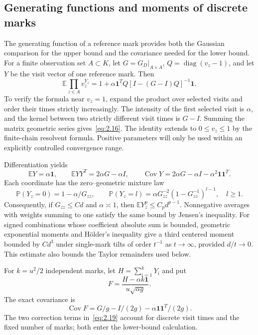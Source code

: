 \documentclass[11pt,a4paper]{article}
\numberwithin{equation}{section}
\theoremstyle{remark}
\begin{document}
\subsection{Generating functions and moments of discrete marks}\label{sec:markformulas}
The generating function of a reference mark provides both the Gaussian comparison for the upper bound and the covariance needed for the lower bound. For a finite observation set $A\subset K$, let $G=G_D|_{A\times A}$, $Q=\operatorname{diag}(v_z-1)$, and let $Y$ be the visit vector of one reference mark. Then
\begin{equation}\label{eq:2.16}
\mathbb E\prod_{z\in A}v_z^{Y_z}
=1+\alpha\mathbf1^TQ[I-(G-I)Q]^{-1}\mathbf1.
\end{equation}
To verify the formula near $v_z=1$, expand the product over selected visits and order their times strictly increasingly. The intensity of the first selected visit is $\alpha$, and the kernel between two strictly different visit times is $G-I$. Summing the matrix geometric series gives~\eqref{eq:2.16}. The identity extends to $0\le v_z\le1$ by the finite-chain resolvent formula. Positive parameters will only be used within an explicitly controlled convergence range.

Differentiation yields
\begin{equation}\label{eq:2.17}
\mathbb EY=\alpha\mathbf1,\qquad
\mathbb EYY^T=2\alpha G-\alpha I,\qquad
\operatorname{Cov}Y=2\alpha G-\alpha I-\alpha^2\mathbf1\mathbf1^T.
\end{equation}
Each coordinate has the zero--geometric mixture law
\begin{equation}\label{eq:2.18}
\mathbb P(Y_z=0)=1-\alpha/G_{zz},\qquad
\mathbb P(Y_z=l)=\alpha G_{zz}^{-2}(1-G_{zz}^{-1})^{l-1},\quad l\ge1.
\end{equation}
Consequently, if $G_{zz}\le Cd$ and $\alpha\asymp1$, then $\mathbb E Y_z^p\le C_pd^{p-1}$. Nonnegative averages with weights summing to one satisfy the same bound by Jensen's inequality. For signed combinations whose coefficient absolute sum is bounded, geometric exponential moments and H\"older's inequality give a third centered moment bounded by $Cd^3$ under single-mark tilts of order $t^{-1}$ as $t\to\infty$, provided $d/t\to0$. This estimate also bounds the Taylor remainders used below.

For $k=u^2/2$ independent marks, let $H=\sum_{i=1}^kY_i$ and put
\[
F=\frac{H-\alpha k\mathbf1}{u\sqrt{\alpha g}}.
\]
The exact covariance is
\begin{equation}\label{eq:2.19}
\operatorname{Cov}F=G/g-I/(2g)-\alpha\mathbf1\mathbf1^T/(2g).
\end{equation}
The two correction terms in~\eqref{eq:2.19} account for discrete visit times and the fixed number of marks; both enter the lower-bound calculation.
\end{document}
